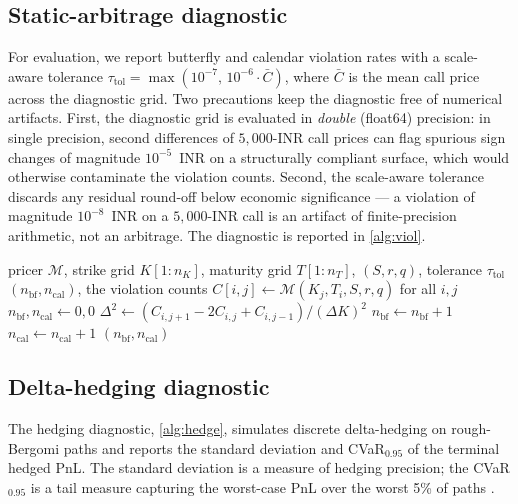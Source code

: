 \documentclass[largeformat]{interact}
\let\cite\citep   %
\theoremstyle{plain}
\theoremstyle{definition}
\begin{document}
\subsection{Static-arbitrage diagnostic}
\label{sec:diagnostic}

For evaluation, we report butterfly and calendar violation rates with a scale-aware tolerance $\tau_{\mathrm{tol}} = \max(10^{-7},\, 10^{-6}\cdot \bar C)$, where $\bar C$ is the mean call price across the diagnostic grid. Two precautions keep the diagnostic free of numerical artifacts. First, the diagnostic grid is evaluated in \emph{double} (float64) precision: in single precision, second differences of $5{,}000$-INR call prices can flag spurious sign changes of magnitude $10^{-5}$~INR on a structurally compliant surface, which would otherwise contaminate the violation counts. Second, the scale-aware tolerance discards any residual round-off below economic significance --- a violation of magnitude $10^{-8}$~INR on a $5{,}000$-INR call is an artifact of finite-precision arithmetic, not an arbitrage. The diagnostic is reported in \cref{alg:viol}.

\begin{algorithm}[t]
\caption{Scale-aware static-arbitrage diagnostic}
\label{alg:viol}
\begin{algorithmic}[1]
\Require pricer $\mathcal{M}$, strike grid $K[1{:}n_K]$, maturity grid $T[1{:}n_T]$, $(S, r, q)$, tolerance $\tau_{\mathrm{tol}}$
\Ensure $(n_{\mathrm{bf}}, n_{\mathrm{cal}})$, the violation counts
\State $C[i, j] \gets \mathcal{M}(K_j, T_i, S, r, q)$ for all $i, j$
\State $n_{\mathrm{bf}}, n_{\mathrm{cal}} \gets 0, 0$
  \State $\Delta^2 \gets (C_{i,j+1} - 2C_{i,j} + C_{i,j-1})/(\Delta K)^2$
   $n_{\mathrm{bf}} \gets n_{\mathrm{bf}} + 1$ \EndIf
\EndFor
{}
   $n_{\mathrm{cal}} \gets n_{\mathrm{cal}} + 1$ \EndIf
\EndFor
\State \Return $(n_{\mathrm{bf}}, n_{\mathrm{cal}})$
\end{algorithmic}
\end{algorithm}

\subsection{Delta-hedging diagnostic}
\label{sec:hedge-diagnostic}

The hedging diagnostic, \cref{alg:hedge}, simulates discrete delta-hedging on rough-Bergomi paths and reports the standard deviation and CVaR$_{0.95}$ of the terminal hedged PnL. The standard deviation is a measure of hedging precision; the CVaR$_{0.95}$ is a tail measure capturing the worst-case PnL over the worst 5\% of paths \cite{glasserman2003monte,glasserman2010sensitivity}.
\end{document}
